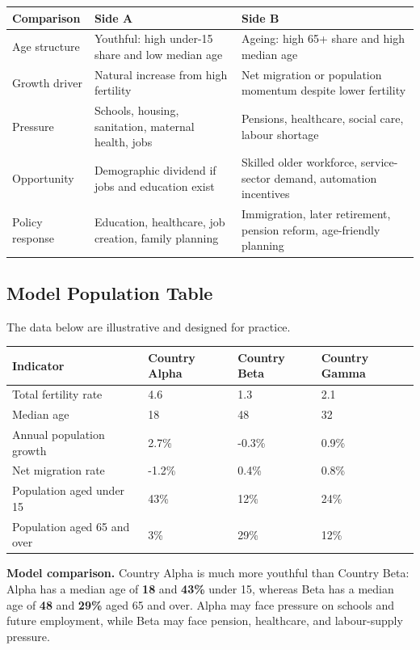 \documentclass[11pt,a4paper]{article}
\newcommand{\term}[1]{\textcolor{HeadingBlue}{\textbf{#1}}}
\newcommand{\boxnote}[3]{%
\noindent\colorbox{#1}{%
  \begin{minipage}{0.965\textwidth}
  \sffamily
  \textbf{\textcolor{HeadingBlue}{#2}} #3
  \end{minipage}
}}
\begin{document}
\begin{tabularx}{\textwidth}{L{0.26\textwidth}Y Y}
\toprule
\textbf{Comparison} & \textbf{Side A} & \textbf{Side B} \\
\midrule
Age structure & Youthful: high under-15 share and low median age & Ageing:
high 65+ share and high median age \\
Growth driver & Natural increase from high fertility & Net migration or
population momentum despite lower fertility \\
Pressure & Schools, housing, sanitation, maternal health, jobs & Pensions,
healthcare, social care, labour shortage \\
Opportunity & Demographic dividend if jobs and education exist & Skilled
older workforce, service-sector demand, automation incentives \\
Policy response & Education, healthcare, job creation, family planning &
Immigration, later retirement, pension reform, age-friendly planning \\
\bottomrule
\end{tabularx}

\subsection{Model Population Table}

The data below are illustrative and designed for practice.

\begin{tabularx}{\textwidth}{L{0.24\textwidth}C{0.17\textwidth}C{0.17\textwidth}C{0.17\textwidth}}
\toprule
\textbf{Indicator} & \textbf{Country Alpha} & \textbf{Country Beta} & \textbf{Country Gamma} \\
\midrule
Total fertility rate & 4.6 & 1.3 & 2.1 \\
Median age & 18 & 48 & 32 \\
Annual population growth & 2.7\% & -0.3\% & 0.9\% \\
Net migration rate & -1.2\% & 0.4\% & 0.8\% \\
Population aged under 15 & 43\% & 12\% & 24\% \\
Population aged 65 and over & 3\% & 29\% & 12\% \\
\bottomrule
\end{tabularx}

\boxnote{SoftGreen}{Model comparison.}{Country Alpha is much more youthful
than Country Beta: Alpha has a median age of \term{18} and \term{43\%} under
15, whereas Beta has a median age of \term{48} and \term{29\%} aged 65 and
over. Alpha may face pressure on schools and future employment, while Beta may
face pension, healthcare, and labour-supply pressure.}
\end{document}
